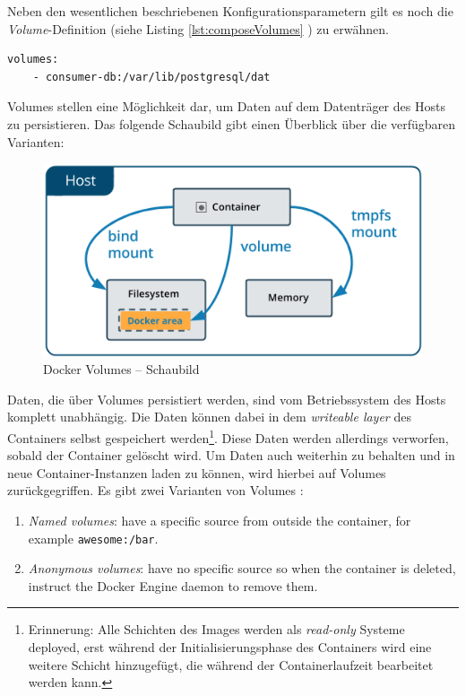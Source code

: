 Neben den wesentlichen beschriebenen Konfigurationsparametern gilt es noch die \emph{Volume}-Definition (siehe Listing \ref{lst:composeVolumes} ) zu erwähnen. 


\begin{lstlisting}[style=bashStyle,caption={Docker Compose - Volume Definition},label=lst:composeVolumes]
  volumes:
    - consumer-db:/var/lib/postgresql/dat
\end{lstlisting}

Volumes stellen eine Möglichkeit dar, um Daten auf dem Datenträger des Hosts zu persistieren. Das folgende Schaubild gibt einen Überblick über die verfügbaren Varianten:

\begin{figure}[ht!]
	\centering
	\includegraphics[width=.6\linewidth]{kapitel/problemloesung/implementierung/_img/types-of-mounts-volume}
	\caption[Docker Volumes -- Schaubild]{Docker Volumes -- Schaubild \cite[Kapitel~/storage/volumes/]{docker-doc}}
	\label{fig:dockerImage}
\end{figure}

Daten, die über Volumes persistiert werden, sind vom Betriebssystem des Hosts komplett unabhängig. Die Daten können dabei in dem \emph{writeable layer} des Containers selbst gespeichert werden\footnote{Erinnerung: Alle Schichten des Images werden als \emph{read-only} Systeme deployed, erst während der Initialisierungsphase des Containers wird eine weitere Schicht hinzugefügt, die während der Containerlaufzeit bearbeitet werden kann.}. Diese Daten werden allerdings verworfen, sobald der Container gelöscht wird. Um Daten auch weiterhin zu behalten und in neue Container-Instanzen laden zu können, wird hierbei auf Volumes zurückgegriffen. Es gibt zwei Varianten von Volumes \cite[Kapitel~/storage/volumes]{docker-doc}: 

\begin{enumerate}
  \item \emph{Named volumes}: have a specific source from outside the container, for example \verb+awesome:/bar+.
  \item \emph{Anonymous volumes}: have no specific source so when the container is deleted, instruct the Docker Engine daemon to remove them.
\end{enumerate}

